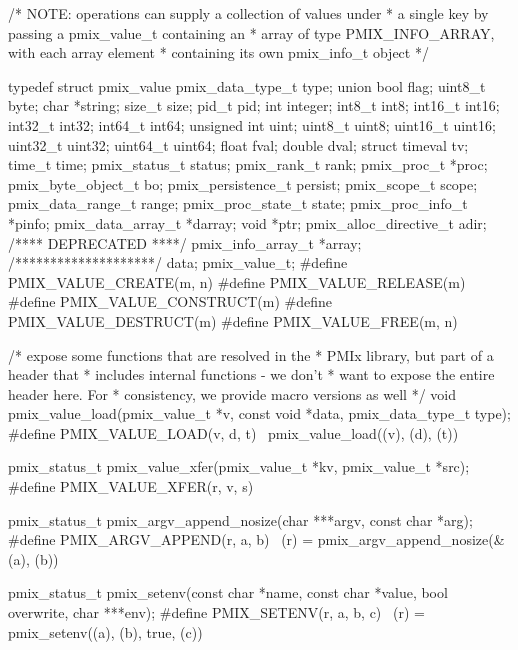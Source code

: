 \cspecificstart
\begin{codepar}
/* NOTE: operations can supply a collection of values under
 * a single key by passing a pmix_value_t containing an
 * array of type PMIX_INFO_ARRAY, with each array element
 * containing its own pmix_info_t object */

typedef struct pmix_value {
    pmix_data_type_t type;
    union {
        bool flag;
        uint8_t byte;
        char *string;
        size_t size;
        pid_t pid;
        int integer;
        int8_t int8;
        int16_t int16;
        int32_t int32;
        int64_t int64;
        unsigned int uint;
        uint8_t uint8;
        uint16_t uint16;
        uint32_t uint32;
        uint64_t uint64;
        float fval;
        double dval;
        struct timeval tv;
        time_t time;
        pmix_status_t status;
        pmix_rank_t rank;
        pmix_proc_t *proc;
        pmix_byte_object_t bo;
        pmix_persistence_t persist;
        pmix_scope_t scope;
        pmix_data_range_t range;
        pmix_proc_state_t state;
        pmix_proc_info_t *pinfo;
        pmix_data_array_t *darray;
        void *ptr;
        pmix_alloc_directive_t adir;
        /**** DEPRECATED ****/
        pmix_info_array_t *array;
        /********************/
    } data;
} pmix_value_t;
#define PMIX_VALUE_CREATE(m, n)
#define PMIX_VALUE_RELEASE(m)
#define PMIX_VALUE_CONSTRUCT(m)
#define PMIX_VALUE_DESTRUCT(m)
#define PMIX_VALUE_FREE(m, n)

/* expose some functions that are resolved in the
 * PMIx library, but part of a header that
 * includes internal functions - we don't
 * want to expose the entire header here. For
 * consistency, we provide macro versions as well
 */
void pmix_value_load(pmix_value_t *v, const void *data, pmix_data_type_t type);
#define PMIX_VALUE_LOAD(v, d, t) \
    pmix_value_load((v), (d), (t))

pmix_status_t pmix_value_xfer(pmix_value_t *kv, pmix_value_t *src);
#define PMIX_VALUE_XFER(r, v, s)                                \

pmix_status_t pmix_argv_append_nosize(char ***argv, const char *arg);
#define PMIX_ARGV_APPEND(r, a, b) \
    (r) = pmix_argv_append_nosize(&(a), (b))

pmix_status_t pmix_setenv(const char *name, const char *value,
                          bool overwrite, char ***env);
#define PMIX_SETENV(r, a, b, c) \
    (r) = pmix_setenv((a), (b), true, (c))
\end{codepar}
\cspecificend


